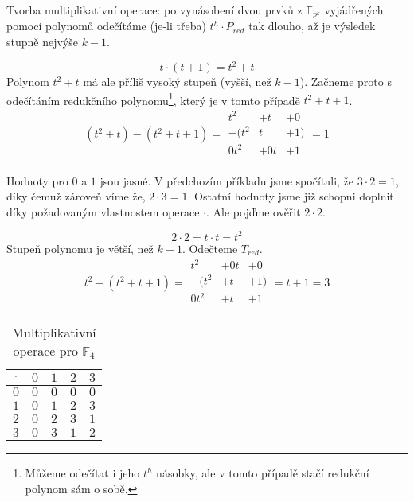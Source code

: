 Tvorba multiplikativní operace: po vynásobení dvou prvků z $\mathbb{F}_{p^k}$ vyjádřených pomocí
polynomů odečítáme (je-li třeba) $t^h \cdot P_{red}$ tak dlouho, až je výsledek stupně nejvýše
$k - 1$.

\begin{example}
$$t \cdot (t + 1) = t^2 + t$$
Polynom $t^2 + t$ má ale příliš vysoký stupeň (vyšší, než $k - 1$). Začneme proto s odečítáním
redukčního polynomu\footnote{Můžeme odečítat i jeho $t^h$ násobky, ale v tomto případě stačí
redukční polynom sám o sobě.}, který je v tomto případě $t^2 + t + 1$.
\[
    (t^2 + t) - (t^2 + t + 1)
    =
    \begin{array}{rrr}
        t^2&+t&+0 \\
       -(t^2&t&+1) \\ \hline
        0t^2&+0t&+1 \\
        &&
    \end{array}
    = 1
\]
\end{example}

\begin{example}
    Hodnoty pro $0$ a $1$ jsou jasné. V předchozím příkladu jsme spočítali,
    že $3 \cdot 2 = 1$, díky čemuž zároveň víme že, $2 \cdot 3 = 1$. Ostatní
    hodnoty jsme již schopni doplnit díky požadovaným vlastnostem operace $\cdot$.
    Ale pojďme ověřit $2 \cdot 2$.

    $$2 \cdot 2 = t \cdot t = t^2$$
    Stupeň polynomu je větší, než $k - 1$. Odečteme $T_{red}$.
    \[
        t^2 - (t^2 + t + 1)
        =
        \begin{array}{rrr}
            t^2&+0t&+0 \\
           -(t^2&+t&+1) \\ \hline
            0t^2&+t&+1 \\
            &&
        \end{array}
        = t + 1 = 3
    \]

    \begin{table}[h]
        \centering
        \begin{tabular}{|c|c|c|c|c|}
        \hline
        $\cdot$ & $0$ & $1$ & $2$ & $3$ \\ \hline
        $0$     & $0$ & $0$ & $0$ & $0$ \\ \hline
        $1$     & $0$ & $1$ & $2$ & $3$ \\ \hline
        $2$     & $0$ & $2$ & $3$ & $1$ \\ \hline
        $3$     & $0$ & $3$ & $1$ & $2$ \\ \hline
        \end{tabular}
        \caption{Multiplikativní operace pro $\mathbb{F}_{4}$}
        \label{tab:F4_mul}
    \end{table}
\end{example}

